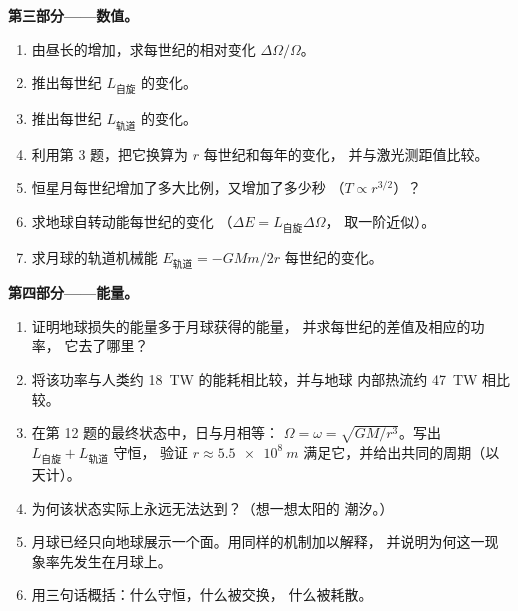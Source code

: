 \begin{problem}
\medskip
\noindent\textbf{第三部分——数值。}
\begin{enumerate}[resume]
  \item 由昼长的增加，求每世纪的相对变化
        $\Delta\Omega/\Omega$。
  \item 推出每世纪 $L_{\text{自旋}}$ 的变化。
  \item 推出每世纪 $L_{\text{轨道}}$ 的变化。
  \item 利用第 3 题，把它换算为 $r$ 每世纪和每年的变化，
        并与激光测距值比较。
  \item 恒星月每世纪增加了多大比例，又增加了多少秒
        （$T \propto r^{3/2}$）？
  \item 求地球自转动能每世纪的变化
        （$\Delta E = L_{\text{自旋}}\Delta\Omega$，
        取一阶近似）。
  \item 求月球的轨道机械能
        $E_{\text{轨道}} = -GMm/2r$ 每世纪的变化。
\end{enumerate}

\medskip
\noindent\textbf{第四部分——能量。}
\begin{enumerate}[resume]
  \item 证明地球损失的能量多于月球获得的能量，
        并求每世纪的差值及相应的功率，
        它去了哪里？
  \item 将该功率与人类约
        \qty{18}{TW} 的能耗相比较，并与地球
        内部热流约 \qty{47}{TW} 相比较。
  \item 在第 12 题的最终状态中，日与月相等：
        $\Omega = \omega = \sqrt{GM/r^3}$。写出 $L_{\text{自旋}} + L_{\text{轨道}}$ 守恒，
        验证 $r \approx
        \qty{5.5e8}{m}$ 满足它，并给出共同的周期（以天计）。
  \item 为何该状态实际上永远无法达到？（想一想太阳的
        潮汐。）
  \item 月球已经只向地球展示一个面。用同样的机制加以解释，
        并说明为何这一现象率先发生在月球上。
  \item 用三句话概括：什么守恒，什么被交换，
        什么被耗散。
\end{enumerate}
\end{problem}
